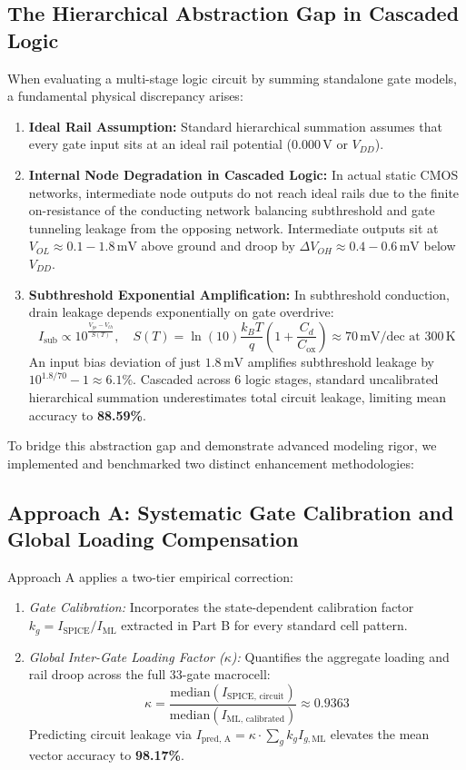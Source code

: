 \documentclass[11pt,a4paper]{article}
\begin{document}
\subsection{The Hierarchical Abstraction Gap in Cascaded Logic}
When evaluating a multi-stage logic circuit by summing standalone gate models, a fundamental physical discrepancy arises:
\begin{enumerate}
    \item \textbf{Ideal Rail Assumption:} Standard hierarchical summation assumes that every gate input sits at an ideal rail potential ($0.000\,\text{V}$ or $V_{DD}$).
    \item \textbf{Internal Node Degradation in Cascaded Logic:} In actual static CMOS networks, intermediate node outputs do not reach ideal rails due to the finite on-resistance of the conducting network balancing subthreshold and gate tunneling leakage from the opposing network. Intermediate outputs sit at $V_{OL} \approx 0.1 - 1.8\,\text{mV}$ above ground and droop by $\Delta V_{OH} \approx 0.4 - 0.6\,\text{mV}$ below $V_{DD}$.
    \item \textbf{Subthreshold Exponential Amplification:} In subthreshold conduction, drain leakage depends exponentially on gate overdrive:
    \begin{equation}
        I_{\text{sub}} \propto 10^{\frac{V_{gs} - V_{th}}{S(T)}}, \quad S(T) = \ln(10) \frac{k_B T}{q}\left(1 + \frac{C_d}{C_{\text{ox}}}\right) \approx 70\,\text{mV/dec at } 300\,\text{K}
    \end{equation}
    An input bias deviation of just $1.8\,\text{mV}$ amplifies subthreshold leakage by $10^{1.8/70} - 1 \approx 6.1\%$. Cascaded across 6 logic stages, standard uncalibrated hierarchical summation underestimates total circuit leakage, limiting mean accuracy to \textbf{88.59\%}.
\end{enumerate}

To bridge this abstraction gap and demonstrate advanced modeling rigor, we implemented and benchmarked two distinct enhancement methodologies:

\subsection{Approach A: Systematic Gate Calibration and Global Loading Compensation}
Approach A applies a two-tier empirical correction:
\begin{enumerate}
    \item \textit{Gate Calibration:} Incorporates the state-dependent calibration factor $k_g = I_{\text{SPICE}} / I_{\text{ML}}$ extracted in Part B for every standard cell pattern.
    \item \textit{Global Inter-Gate Loading Factor ($\kappa$):} Quantifies the aggregate loading and rail droop across the full 33-gate macrocell:
    \begin{equation}
        \kappa = \frac{\text{median}(I_{\text{SPICE, circuit}})}{\text{median}(I_{\text{ML, calibrated}})} \approx 0.9363
    \end{equation}
    Predicting circuit leakage via $I_{\text{pred, A}} = \kappa \cdot \sum_{g} k_g I_{g,\text{ML}}$ elevates the mean vector accuracy to \textbf{98.17\%}.
\end{enumerate}
\end{document}
